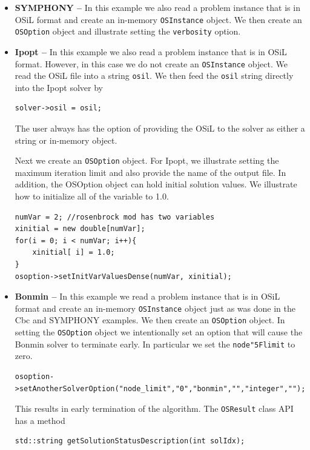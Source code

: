 \documentclass[11pt]{article}
\renewcommand{\_}{{\char"5F}}
\renewcommand{\{}{{\char"7B}}
\renewcommand{\}}{{\char"7D}}
\renewcommand{\^}{{\char"0D}}
\renewcommand{\'}{{\char"0D}}
\begin{document}
\begin{enumerate}[Step 1:]
\begin{itemize}
\item {\bf SYMPHONY --}   In this example we also read a problem instance that is in OSiL format and 
create an in-memory {\tt OSInstance} object.  We then create an {\tt OSOption} object and 
illustrate setting the {\tt verbosity} option.

\item {\bf Ipopt --}   In this example we also read a problem instance that is in OSiL format.  
However, in this case we do  not create an {\tt OSInstance} object. We read the OSiL file into 
a string {\tt osil}.  We then feed the {\tt osil} string directly into the Ipopt solver by
\begin{verbatim}
solver->osil = osil;
\end{verbatim} 
The user always has the option of providing the OSiL to the solver as either a string or in-memory object.

Next we create an {\tt OSOption} object. For Ipopt, we illustrate setting the maximum iteration limit 
and also provide the name of the output file. In addition, the OSOption object can hold initial solution 
values. We illustrate how to initialize all of the variable to 1.0.

\begin{verbatim}
numVar = 2; //rosenbrock mod has two variables 
xinitial = new double[numVar];
for(i = 0; i < numVar; i++){
    xinitial[ i] = 1.0;
}
osoption->setInitVarValuesDense(numVar, xinitial);
\end{verbatim}



\item {\bf Bonmin --}  In this example we read a problem instance that is in OSiL format and create 
an in-memory {\tt OSInstance} object just as was done in the Cbc and SYMPHONY examples.   
We then create an {\tt OSOption} object.  In setting the  {\tt OSOption} object we intentionally 
set an option that will cause the Bonmin solver to terminate early.  In particular we set the 
{\tt node\_limit} to zero. 

\begin{verbatim}
osoption->setAnotherSolverOption("node_limit","0","bonmin","","integer","");
\end{verbatim}

This results in early termination of the algorithm. The {\tt OSResult} class API has a method
\begin{verbatim}
std::string getSolutionStatusDescription(int solIdx);
\end{verbatim}


\end{itemize}
\end{enumerate}
\end{document}
